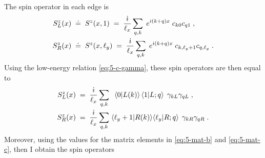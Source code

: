 The spin operator in each edge is 
\begin{align}
    S^{z}_L (x) \; &\doteq  \;  S^{z} (x,1)  \; = \; \frac{\dot{\imath}}{\ell_x} \sum_{q,k }  \; e^{ \dot{\imath} (k+q) x}  \;  c_{k0}  c_{q1}   \; ,  \\
    S^{z}_R(x) \; & \doteq \;  S^{z} (x,\ell_y)  \; = \; \frac{\dot{\imath}}{\ell_x} \sum_{q,k }  \; e^{ \dot{\imath} (k+q) x}  \;   c_{k,\ell_y+1}  c_{q,\ell_y}     \; .
\end{align}
Using the low-energy relation \eqref{eq:5-c-gamma}, these spin operators are then equal to 
\begin{align}
    S^{z}_L (x) \; & = \; \frac{\dot{\imath}}{\ell_x} \sum_{q,k   }  \;  \;  \, \langle 0 \vert L(k) \rangle  \, \langle 1 \vert L; q  \rangle \,   \;  \gamma_{kL}  \gamma_{qL}  \; ,  \\
    S^{z}_R(x) \; &= \; \frac{\dot{\imath}}{\ell_x} \sum_{q,k   }  \;  \langle \ell_y+1 \vert R(k) \rangle \langle \ell_y \vert R; q  \rangle \,  \; \gamma_{kR}  \gamma_{qR} \; .
\end{align}
Moreover, using the values for the matrix elements in \eqref{eq:5-mat-b} and \eqref{eq:5-mat-c}, then I obtain the spin operators
